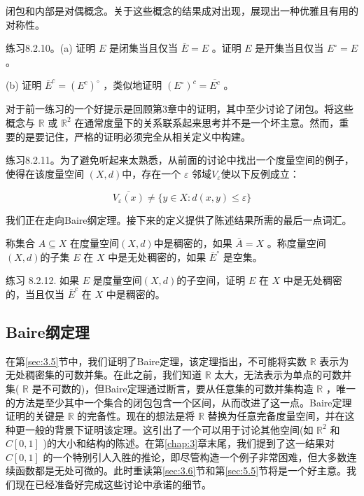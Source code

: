 闭包和内部是对偶概念。关于这些概念的结果成对出现，展现出一种优雅且有用的对称性。

练习8.2.10。(a) 证明 \(E\) 是闭集当且仅当 \(\bar{E} = E\) 。证明 \(E\) 是开集当且仅当 \({E}^{ \circ  } = E\) 。

(b) 证明 \({\bar{E}}^{c} = {\left( {E}^{c}\right) }^{ \circ  }\) ，类似地证明 \({\left( {E}^{ \circ  }\right) }^{c} = \overline{{E}^{c}}\) 。

对于前一练习的一个好提示是回顾第3章中的证明，其中至少讨论了闭包。将这些概念与 \(\mathbb{R}\) 或 \({\mathbb{R}}^{2}\) 在通常度量下的关系联系起来思考并不是一个坏主意。然而，重要的是要记住，严格的证明必须完全从相关定义中构建。

练习8.2.11。为了避免听起来太熟悉，从前面的讨论中找出一个度量空间的例子，使得在该度量空间 $(X,d)$中，存在一个 $\varepsilon$ 邻域$V_{\varepsilon}$使以下反例成立：

\[
\overline{{V}_{\varepsilon }\left( x\right) } \neq  \{ y \in  X : d\left( {x,y}\right)  \leq  \varepsilon \}
\]

我们正在走向Baire纲定理。接下来的定义提供了陈述结果所需的最后一点词汇。

\begin{Def}
  \label{def:8.2.9}
  称集合 \(A \subseteq  X\) 在度量空间$(X, d)$中是稠密的，如果 \(\bar{A} = X\) 。称度量空间$(X, d)$的子集 \(E\) 在 \(X\) 中是无处稠密的，如果 \({\bar{E}}^{ \circ  }\) 是空集。
\end{Def}

练习 8.2.12. 如果 \(E\) 是度量空间$(X, d)$的子空间，证明 \(E\) 在 \(X\) 中是无处稠密的，当且仅当 \({\bar{E}}^{c}\) 在 \(X\) 中是稠密的。

\subsection{Baire纲定理}

在第\ref{sec:3.5}节中，我们证明了Baire定理，该定理指出，不可能将实数 \(\mathbb{R}\) 表示为无处稠密集的可数并集。在此之前，我们知道 \(\mathbb{R}\) 太大，无法表示为单点的可数并集( \(\mathbb{R}\) 是不可数的)，但Baire定理通过断言，要从任意集的可数并集构造 \(\mathbb{R}\) ，唯一的方法是至少其中一个集合的闭包包含一个区间，从而改进了这一点。Baire定理证明的关键是 \(\mathbb{R}\) 的完备性。现在的想法是将 \(\mathbb{R}\) 替换为任意完备度量空间，并在这种更一般的背景下证明该定理。这引出了一个可以用于讨论其他空间(如 \({\mathbb{R}}^{2}\) 和 \(C\left\lbrack  {0,1}\right\rbrack\) )的大小和结构的陈述。在第\ref{chap:3}章末尾，我们提到了这一结果对 \(C\left\lbrack  {0,1}\right\rbrack\) 的一个特别引人入胜的推论，即尽管构造一个例子非常困难，但大多数连续函数都是无处可微的。此时重读第\ref{sec:3.6}节和第\ref{sec:5.5}节将是一个好主意。我们现在已经准备好完成这些讨论中承诺的细节。

